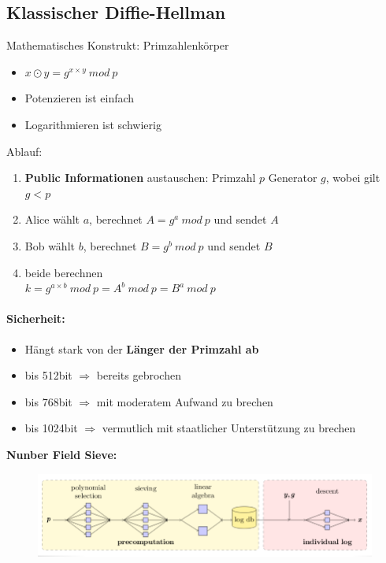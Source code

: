 \subsection{Klassischer Diffie-Hellman}
Mathematisches Konstrukt: Primzahlenkörper
\begin{itemize}
	\item $x \odot y = g^{x \times y} \ mod \ p$
	\item Potenzieren ist einfach
	\item Logarithmieren ist schwierig
\end{itemize}
Ablauf:
\begin{enumerate}
	\item \textbf{Public Informationen} austauschen:
	\subitem Primzahl $p$
	\subitem Generator $g$, wobei gilt $g < p$ 
	\item Alice wählt $a$, berechnet $A = g^a \ mod \ p$ und sendet $A$
	\item Bob wählt $b$, berechnet $B = g^b \ mod \ p$ und sendet $B$
	\item beide berechnen \\
	 $k = g^{a \times b} \ mod \ p = A^{b} \ mod \ p = B^{a} \ mod \ p$
\end{enumerate}
\paragraph{Sicherheit:}
\begin{itemize}
	\item Hängt stark von der \textbf{Länger der Primzahl ab}
	\item bis 512bit $\Rightarrow$ bereits gebrochen
	\item bis 768bit $\Rightarrow$ mit moderatem Aufwand zu brechen
	\item bis 1024bit $\Rightarrow$ vermutlich mit staatlicher Unterstützung zu brechen
\end{itemize}
\textbf{Nunber Field Sieve:}
\begin{figure}[H]
	\begin{center}
		\includegraphics[scale=0.7]{Resources/DH4}
		\caption{}
		\label{fig:DH4}
	\end{center}
\end{figure}

